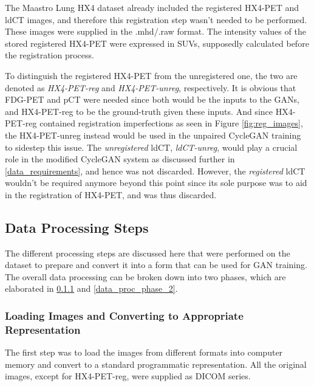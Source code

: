 The Maastro Lung HX4 dataset already included the registered HX4-PET and ldCT images, and therefore this registration step wasn't needed to be performed. These images were supplied in the .mhd/.raw format. The intensity values of the stored registered HX4-PET were expressed in SUVs, supposedly calculated before the registration process. 

To distinguish the registered HX4-PET from the unregistered one, the two are denoted as \textit{HX4-PET-reg} and \textit{HX4-PET-unreg}, respectively. It is obvious that FDG-PET and pCT were needed since both would be the inputs to the GANs, and HX4-PET-reg to be the ground-truth given these inputs. And since HX4-PET-reg contained registration imperfections as seen in Figure \ref{fig:reg_images}, the HX4-PET-unreg instead would be used in the unpaired CycleGAN training to sidestep this issue. The \textit{unregistered} ldCT, \textit{ldCT-unreg}, would play a crucial role in the modified CycleGAN system as discussed further in \ref{data_requirements}, and hence was not discarded. However, the \textit{registered} ldCT wouldn't be required anymore beyond this point since its sole purpose was to aid in the registration of HX4-PET, and was thus discarded.


\subsection{Data Processing Steps}
\label{Data_Processing}
The different processing steps are discussed here that were performed on the dataset to prepare and convert it into a form that can be used for GAN training. The overall data processing can be broken down into two phases, which are elaborated in \ref{data_proc_phase_1} and \ref{data_proc_phase_2}. 

\subsubsection{Loading Images and Converting to Appropriate Representation}
\label{data_proc_phase_1}
The first step was to load the images from different formats into computer memory and convert to a standard programmatic representation. All the original images, except for HX4-PET-reg, were supplied as DICOM series. 

